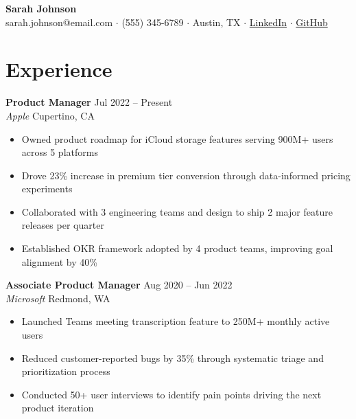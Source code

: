 \documentclass[11pt,letterpaper]{article}
\begin{document}
\begin{center}
  {\LARGE\bfseries\color{heading} Sarah Johnson} \\[5pt]
  {\small
    sarah.johnson@email.com \enspace$\cdot$\enspace
    (555) 345-6789 \enspace$\cdot$\enspace
    Austin, TX \enspace$\cdot$\enspace
    \href{https://linkedin.com/in/sarahjohnson}{LinkedIn} \enspace$\cdot$\enspace
    \href{https://github.com/sarahjohnson}{GitHub}
  }
\end{center}
\vspace{-2pt}

\section{Experience}

\textbf{\color{heading}Product Manager} \hfill {\small Jul 2022 -- Present} \\
{\color{subheading}\textit{Apple}} \hfill {\small\color{subheading} Cupertino, CA}
\begin{itemize}[leftmargin=1.2em, topsep=2pt, itemsep=0pt, parsep=1pt]
  \item Owned product roadmap for iCloud storage features serving 900M+ users across 5 platforms
  \item Drove 23\% increase in premium tier conversion through data-informed pricing experiments
  \item Collaborated with 3 engineering teams and design to ship 2 major feature releases per quarter
  \item Established OKR framework adopted by 4 product teams, improving goal alignment by 40\%
\end{itemize}
\vspace{4pt}

\textbf{\color{heading}Associate Product Manager} \hfill {\small Aug 2020 -- Jun 2022} \\
{\color{subheading}\textit{Microsoft}} \hfill {\small\color{subheading} Redmond, WA}
\begin{itemize}[leftmargin=1.2em, topsep=2pt, itemsep=0pt, parsep=1pt]
  \item Launched Teams meeting transcription feature to 250M+ monthly active users
  \item Reduced customer-reported bugs by 35\% through systematic triage and prioritization process
  \item Conducted 50+ user interviews to identify pain points driving the next product iteration
\end{itemize}
\vspace{4pt}
\end{document}

